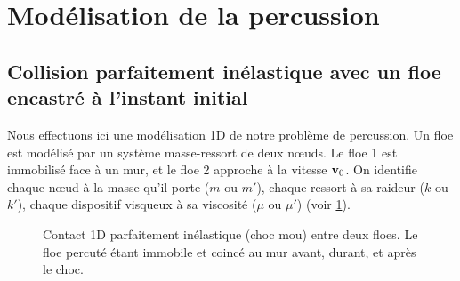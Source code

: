 


\section{Modélisation de la percussion}









\subsection{Collision parfaitement inélastique avec un floe encastré à l'instant initial}



Nous effectuons ici une modélisation 1D de notre problème de percussion. Un floe est modélisé par un système masse-ressort de deux n\oe{}uds. Le floe 1 est immobilisé face à un mur, et le floe 2 approche à la vitesse $\bm{\mathrm{v}}_0$. On identifie chaque n\oe{}ud à la masse qu'il porte ($m$ ou $m'$), chaque ressort à sa raideur ($k$ ou $k'$), chaque dispositif visqueux à sa viscosité ($\mu$ ou $\mu'$) (voir \cref{fig:contact1d}).
\begin{figure}[!h]
    \centering
    \caption{Contact 1D parfaitement inélastique (choc mou) entre deux floes. Le floe percuté étant immobile et coincé au mur avant, durant, et après le choc.}
    \label{fig:contact1d}
\end{figure}

